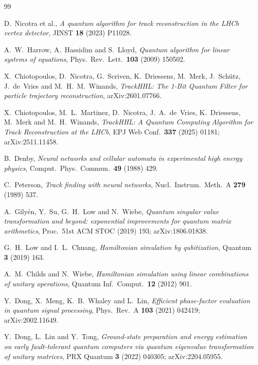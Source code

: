 \documentclass[11pt,a4paper]{article}
\begin{document}
\begin{thebibliography}{99}

D.~Nicotra et al.,
\emph{A quantum algorithm for track reconstruction in the LHCb vertex
detector}, JINST \textbf{18} (2023) P11028.

A.~W.~Harrow, A.~Hassidim and S.~Lloyd,
\emph{Quantum algorithm for linear systems of equations},
Phys.\ Rev.\ Lett.\ \textbf{103} (2009) 150502.

X.~Chiotopoulos, D.~Nicotra, G.~Scriven, K.~Driessens, M.~Merk,
J.~Sch\"utz, J.~de~Vries and M.~H.~M.~Winands,
\emph{TrackHHL: The 1-Bit Quantum Filter for particle trajectory
reconstruction}, arXiv:2601.07766.

X.~Chiotopoulos, M.~L.~Martinez, D.~Nicotra, J.~A.~de~Vries,
K.~Driessens, M.~Merk and M.~H.~Winands,
\emph{TrackHHL: A Quantum Computing Algorithm for Track Reconstruction
at the LHCb}, EPJ Web Conf.\ \textbf{337} (2025) 01181;
arXiv:2511.11458.

B.~Denby,
\emph{Neural networks and cellular automata in experimental high
energy physics}, Comput.\ Phys.\ Commun.\ \textbf{49} (1988) 429.

C.~Peterson,
\emph{Track finding with neural networks},
Nucl.\ Instrum.\ Meth.\ A \textbf{279} (1989) 537.

A.~Gily\'en, Y.~Su, G.~H.~Low and N.~Wiebe,
\emph{Quantum singular value transformation and beyond: exponential
improvements for quantum matrix arithmetics},
Proc.\ 51st ACM STOC (2019) 193; arXiv:1806.01838.

G.~H.~Low and I.~L.~Chuang,
\emph{Hamiltonian simulation by qubitization},
Quantum \textbf{3} (2019) 163.

A.~M.~Childs and N.~Wiebe,
\emph{Hamiltonian simulation using linear combinations of unitary
operations}, Quantum Inf.\ Comput.\ \textbf{12} (2012) 901.

Y.~Dong, X.~Meng, K.~B.~Whaley and L.~Lin,
\emph{Efficient phase-factor evaluation in quantum signal processing},
Phys.\ Rev.\ A \textbf{103} (2021) 042419; arXiv:2002.11649.

Y.~Dong, L.~Lin and Y.~Tong,
\emph{Ground-state preparation and energy estimation on early
fault-tolerant quantum computers via quantum eigenvalue transformation of
unitary matrices}, PRX Quantum \textbf{3} (2022) 040305; arXiv:2204.05955.


\end{thebibliography}
\end{document}

